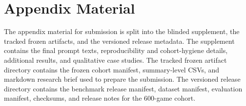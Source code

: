 \section{Appendix Material}
The appendix material for submission is split into the blinded supplement, the tracked frozen artifacts, and the versioned release metadata. The supplement contains the final prompt texts, reproducibility and cohort-hygiene details, additional results, and qualitative case studies. The tracked frozen artifact directory contains the frozen cohort manifest, summary-level CSVs, and markdown research brief used to prepare the submission. The versioned release directory contains the benchmark release manifest, dataset manifest, evaluation manifest, checksums, and release notes for the 600-game cohort.
